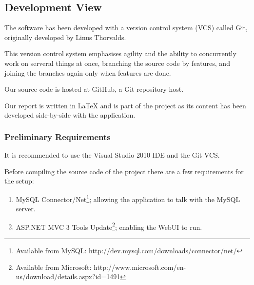 \subsection{Development View}

The software has been developed with a version control system (VCS) called Git\cite{progit},
originally developed by Linus Thorvalds.

This version control system emphasises agility and the ability to concurrently work on serveral
things at once, branching the source code by features, and joining the branches again only when
features are done\cite{sopBranching}.

Our source code is hosted at GitHub, a Git repository host.

Our report is written in \LaTeX\cite{latexBook} and is part of the project as its content has been developed
side-by-side with the application.

\subsubsection{Preliminary Requirements}

It is recommended to use the Visual Studio 2010 IDE and the Git VCS.

Before compiling the source code of the project there are a few requirements for the setup:

\begin{enumerate}
    \item MySQL Connector/Net\footnote{Available from MySQL: http://dev.mysql.com/downloads/connector/net/};
        allowing the application to talk with the MySQL server.
    \item ASP.NET MVC 3 Tools Update\footnote{Available from Microsoft: http://www.microsoft.com/en-us/download/details.aspx?id=1491};
        enabling the WebUI to run.
\end{enumerate}
